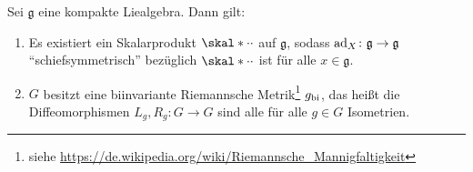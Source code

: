 \begin{lemma}
	Sei $\mathfrak{g}$ eine kompakte Liealgebra.
	Dann gilt:
	\begin{enumerate}[1)]
		\item Es existiert ein Skalarprodukt $\skal*{\cdot}{\cdot}$ auf $\mathfrak{g}$, sodass $\operatorname{ad}_X \colon \mathfrak{g} \to \mathfrak{g}$ \enquote{schiefsymmetrisch} bezüglich $\skal*{\cdot}{\cdot}$ ist für alle $x \in \mathfrak{g}$.
		\item $G$ besitzt eine biinvariante Riemannsche Metrik\footnote{siehe \url{https://de.wikipedia.org/wiki/Riemannsche_Mannigfaltigkeit}} $g_{\mathrm{bi}}$, das heißt die Diffeomorphismen $L_g,R_g \colon G \to G$ sind alle für alle $g \in G$ Isometrien.
	\end{enumerate}
\end{lemma}
